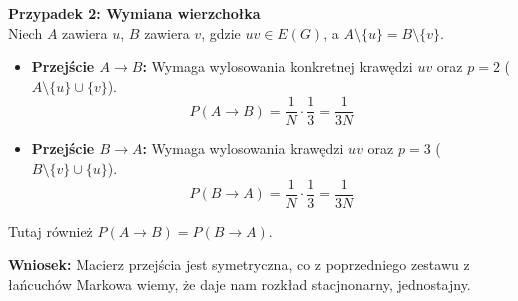 \textbf{Przypadek 2: Wymiana wierzchołka} \\
Niech \(A\) zawiera \(u\), \(B\) zawiera \(v\), gdzie \(uv \in E(G)\), a \(A \setminus \{u\} = B \setminus \{v\}\).
\begin{itemize}
	\item \textbf{Przejście \(A \to B\):} Wymaga wylosowania konkretnej krawędzi \(uv\) oraz \(p=2\) (\(A \setminus \{u\} \cup \{v\}\)).
	      \[ P(A \to B) = \frac{1}{N} \cdot \frac{1}{3} = \frac{1}{3N} \]
	\item \textbf{Przejście \(B \to A\):} Wymaga wylosowania krawędzi \(uv\) oraz \(p=3\) (\(B \setminus \{v\} \cup \{u\}\)).
	      \[ P(B \to A) = \frac{1}{N} \cdot \frac{1}{3} = \frac{1}{3N} \]
\end{itemize}
Tutaj również \(P(A \to B) = P(B \to A)\).

\textbf{Wniosek:}
Macierz przejścia jest symetryczna, co z poprzedniego zestawu z łańcuchów Markowa wiemy, że daje nam rozkład stacjnonarny, jednostajny.